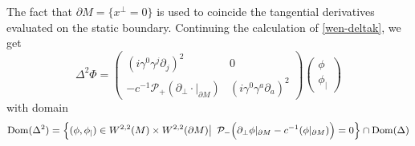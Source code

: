 The fact that $\partial M = \{x^\bot = 0\}$ is used to coincide the tangential derivatives evaluated on the static boundary.
Continuing the calculation of \cref{wen-deltak}, we get
\begin{equation}\label{wen-delta2}
\Delta^2 \Phi = \begin{pmatrix} (i \gamma^0 \gamma^j\partial_j)^2 & 0 \\ 
- c^{-1}\mathcal{P}_+( \partial_\bot \cdot\vert_{\partial M} ) & 
(i \gamma^0 \gamma^a \partial_a)^2 \end{pmatrix}
\begin{pmatrix} \phi \\ \phi_| \end{pmatrix}
\end{equation}
with domain 
\begin{equation*}
\mathrm{Dom}(\Delta^2) = \Big\{ (\phi, \phi_|) \in W^{2,2}(M)\times W^{2,2}(\partial M) \big\vert\enskip \mathcal{P}_- \Big(\partial_\bot\phi\vert_{\partial M} - c^{-1} (\phi\vert_{\partial M}) \Big) = 0 \Big\} \cap \mathrm{Dom}(\Delta)
\end{equation*} 
